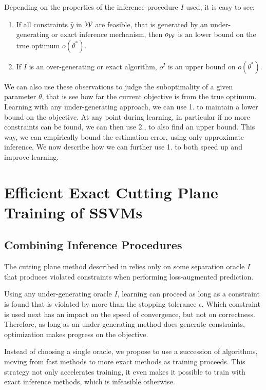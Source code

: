 Depending on the properties of the inference procedure $I$ used, it is easy to see:
\begin{enumerate}
    \item If all constraints $\hat{y}$ in  $\mathcal{W}$ are feasible, that is generated
        by an under-generating or exact inference mechanism, then $o_{\mathcal{W}}$ is
        an lower bound on the true optimum $o(\theta^*)$.

    \item If $I$ is an over-generating or exact algorithm, $o^I$ is an upper
        bound on $o(\theta^*)$.
\end{enumerate}

We can also use these observations to judge the suboptimality of a given
parameter $\theta$, that is see how far the current objective is from the true
optimum.  Learning with any under-generating approach, we can use 1. to
maintain a lower bound on the objective. At any point during learning, in
particular if no more constraints can be found, we can then use 2., to also
find an upper bound.  This way, we can empirically bound the estimation error,
using only approximate inference.  We now describe how we can further use 1. to
both speed up and improve learning.


\section{Efficient Exact Cutting Plane Training of SSVMs}

\subsection{Combining Inference Procedures}
The cutting plane method described in  relies only
on some separation oracle $I$ that produces violated constraints when
performing loss-augmented prediction.

Using any under-generating oracle $I$, learning can proceed as long as a
constraint is found that is violated by more than the stopping tolerance
$\epsilon$.  Which constraint is used next has an impact on the speed of
convergence, but not on correctness. Therefore, as long as an under-generating
method does generate constraints, optimization makes progress on the objective.

Instead of choosing a single oracle, we propose to use a succession of
algorithms, moving from fast methods to more exact methods as training
proceeds. This strategy not only accelerates training, it even makes it
possible to train with exact inference methods, which is infeasible otherwise.

